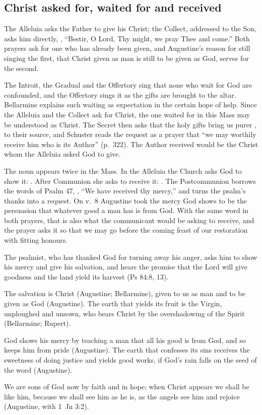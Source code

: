 \subsection{Christ asked for, waited for and received}

The Alleluia asks the Father to give his Christ; the Collect, addressed to the
Son, asks him directly, , ``Bestir, O Lord, Thy might, we pray Thee and come.'' Both prayers ask
for one who has already been given, and Augustine's reason for still singing
the first, that Christ given as man is still to be given as God, serves for
the second.

The Introit, the Gradual and the Offertory sing that none who wait for God are
confounded, and the Offertory sings it as the gifts are brought to the altar.
Bellarmine explains such waiting as expectation in the certain hope of help.
Since the Alleluia and the Collect ask for Christ, the one waited for in this
Mass may be understood as Christ. The Secret then asks that the holy gifts
bring us purer , to their source, and Schuster reads the
request as a prayer that ``we may worthily receive him who is its Author''
(p.~322). The Author received would be the Christ whom the Alleluia asked
God to give.

The noun  appears twice in the Mass. In the Alleluia the
Church asks God to show it: .
After Communion she asks to receive it: . The Postcommunion borrows the words
of Psalm 47, , ``We have received thy mercy,'' and turns
the psalm's thanks into a request. On v.~8 Augustine took the mercy God shows
to be the persuasion that whatever good a man has is from God. With the
same word in both prayers, that is also what the communicant would be asking
to receive, and the prayer asks it so that we may go before the coming feast
of our restoration with fitting honours.

\begin{fourSenses}
\item[Literal.] The psalmist, who has thanked God for turning away his anger,
asks him to show his mercy and give his salvation, and hears the promise that
the Lord will give goodness and the land yield its harvest (Ps 84:8, 13).
\item[Allegorical.] The salvation is Christ (Augustine; Bellarmine), given to
us as man and to be given as God (Augustine). The earth that yields its fruit
is the Virgin, unploughed and unsown, who bears Christ by the overshadowing
of the Spirit (Bellarmine; Rupert).
\item[Moral.] God shows his mercy by teaching a man that all his good is from
God, and so keeps him from pride (Augustine). The earth that confesses its
sins receives the sweetness of doing justice and yields good works, if God's
rain falls on the seed of the word (Augustine).
\item[Anagogical.] We are sons of God now by faith and in hope; when Christ
appears we shall be like him, because we shall see him as he is, as the angels
see him and rejoice (Augustine, with 1~Jn 3:2).
\end{fourSenses}
